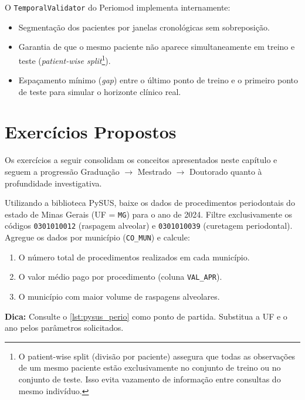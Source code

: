 O \texttt{TemporalValidator} do Periomod implementa internamente:
\begin{itemize}
\item Segmentação dos pacientes por janelas cronológicas sem
sobreposição.
\item Garantia de que o mesmo paciente não aparece simultaneamente em
treino e teste (\textit{patient-wise split}\footnote{O
patient-wise split (divisão por paciente) assegura que todas as
observações de um mesmo paciente estão exclusivamente no conjunto de
treino ou no conjunto de teste. Isso evita vazamento de informação
entre consultas do mesmo indivíduo.}).
\item Espaçamento mínimo (\textit{gap}) entre o último ponto de
treino e o primeiro ponto de teste para simular o horizonte clínico
real.
\end{itemize}

\section{Exercícios Propostos}

Os exercícios a seguir consolidam os conceitos apresentados neste
capítulo e seguem a progressão Graduação \(\to\) Mestrado \(\to\)
Doutorado quanto à profundidade investigativa.

\begin{exercicio}
\label{ex:preparar_dataset}
Utilizando a biblioteca PySUS, baixe os dados de procedimentos
periodontais do estado de Minas Gerais (UF = \texttt{MG}) para o ano
de 2024. Filtre exclusivamente os códigos \texttt{0301010012}
(raspagem alveolar) e \texttt{0301010039} (curetagem periodontal).
Agregue os dados por município (\texttt{CO\_MUN}) e calcule:
\begin{enumerate}
\item O número total de procedimentos realizados em cada município.
\item O valor médio pago por procedimento (coluna \texttt{VAL\_APR}).
\item O município com maior volume de raspagens alveolares.
\end{enumerate}
\textbf{Dica:} Consulte o \autoref{lst:pysus_perio} como ponto de
partida. Substitua a UF e o ano pelos parâmetros solicitados.
\end{exercicio}

